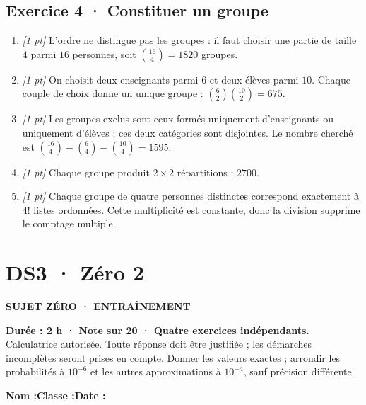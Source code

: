 \subsection*{Exercice 4 · Constituer un groupe}\begin{enumerate}

\item \textit{[1 pt]} L'ordre ne distingue pas les groupes : il faut choisir une partie de taille $4$ parmi $16$ personnes, soit $\binom{16}4=1820$ groupes.

\item \textit{[1 pt]} On choisit deux enseignants parmi $6$ et deux élèves parmi $10$. Chaque couple de choix donne un unique groupe : $\binom{6}2\binom{10}2=675$.

\item \textit{[1 pt]} Les groupes exclus sont ceux formés uniquement d'enseignants ou uniquement d'élèves ; ces deux catégories sont disjointes. Le nombre cherché est $\binom{16}4-\binom{6}4-\binom{10}4=1595$.

\item \textit{[1 pt]} Chaque groupe produit $2\times2$ répartitions : $2700$.

\item \textit{[1 pt]} Chaque groupe de quatre personnes distinctes correspond exactement à $4!$ listes ordonnées. Cette multiplicité est constante, donc la division supprime le comptage multiple.

\end{enumerate}

\fi

\clearpage{}\label{sujet:4-2}

\section*{DS3 · Zéro 2}

{\sffamily\bfseries\color{teal}SUJET ZÉRO · ENTRAÎNEMENT\par}

\textbf{Durée : 2 h · Note sur 20 · Quatre exercices indépendants.}\\Calculatrice autorisée. Toute réponse doit être justifiée ; les démarches incomplètes seront prises en compte. Donner les valeurs exactes ; arrondir les probabilités à $10^{-6}$ et les autres approximations à $10^{-4}$, sauf précision différente.

\smallskip\textbf{Nom :}\enspace\dotfill\quad\textbf{Classe :}\enspace\dotfill\quad\textbf{Date :}\enspace\dotfill

